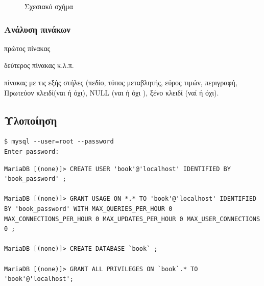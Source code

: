 \documentclass{assignment}
\begin{document}
\begin{landscape}
\begin{figure}
\begin{center}
\caption{Σχεσιακό σχήμα}
\label{fig:RelationalModel:diagram}
\end{center}
\end{figure}
\end{landscape}



\subsubsection{Ανάλυση πινάκων}

πρώτος πίνακας

δεύτερος πίνακας κ.λ.π.

πίνακας με τις εξής στήλες (πεδίο, τύπος μεταβλητής, εύρος τιμών, περιγραφή, Πρωτεύον κλειδί(ναι ή όχι), NULL (ναι ή όχι ), ξένο κλειδί (ναί ή όχι).

\subsection{Υλοποίηση}



\begin{verbatim}
$ mysql --user=root --password
Enter password: 
\end{verbatim} 


\begin{verbatim}
MariaDB [(none)]> CREATE USER 'book'@'localhost' IDENTIFIED BY 'book_password' ;

MariaDB [(none)]> GRANT USAGE ON *.* TO 'book'@'localhost' IDENTIFIED BY 'book_password' WITH MAX_QUERIES_PER_HOUR 0 MAX_CONNECTIONS_PER_HOUR 0 MAX_UPDATES_PER_HOUR 0 MAX_USER_CONNECTIONS 0 ;

MariaDB [(none)]> CREATE DATABASE `book` ;

MariaDB [(none)]> GRANT ALL PRIVILEGES ON `book`.* TO 'book'@'localhost';

\end{verbatim}
\end{document}
